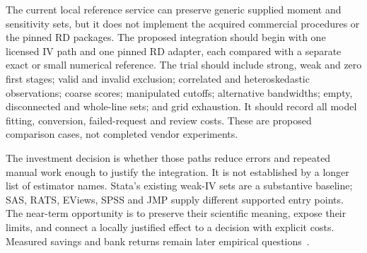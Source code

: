 The current local reference service can preserve generic supplied
moment and sensitivity sets, but it does not implement the acquired
commercial procedures or the pinned RD packages. The proposed
integration should begin with one licensed IV path and one pinned
RD adapter, each compared with a separate exact or small numerical
reference. The trial should include strong, weak and zero first stages;
valid and invalid exclusion; correlated and heteroskedastic observations;
coarse scores; manipulated cutoffs; alternative bandwidths; empty,
disconnected and whole-line sets; and grid exhaustion. It should
record all model fitting, conversion, failed-request and review costs.
These are proposed comparison cases, not completed vendor experiments.

The investment decision is whether those paths reduce errors and
repeated manual work enough to justify the integration. It is not
established by a longer list of estimator names. Stata's existing
weak-IV sets are a substantive baseline; SAS, RATS, EViews, SPSS
and JMP supply different supported entry points. The near-term
opportunity is to preserve their scientific meaning, expose their
limits, and connect a locally justified effect to a decision with
explicit costs. Measured savings and bank returns remain later
empirical questions~\citep{exec13_ivrd_survey,exec13_ivrd_exact}.
\label{exec13:commercial-iv-rd-end}
